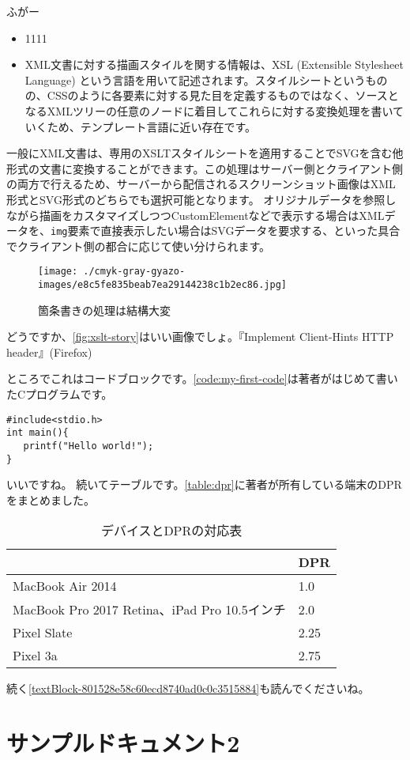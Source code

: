 ふがー
\begin{itemize}
  \item 1111
  \item XML文書に対する描画スタイルを関する情報は、XSL (Extensible Stylesheet Language) という言語を用いて記述されます。スタイルシートというものの、CSSのように各要素に対する見た目を定義するものではなく、ソースとなるXMLツリーの任意のノードに着目してこれらに対する変換処理を書いていくため、テンプレート言語に近い存在です。
\end{itemize}

一般にXML文書は、専用のXSLTスタイルシートを適用することでSVGを含む他形式の文書に変換することができます。この処理はサーバー側とクライアント側の両方で行えるため、サーバーから配信されるスクリーンショット画像はXML形式とSVG形式のどちらでも選択可能となります。
オリジナルデータを参照しながら描画をカスタマイズしつつCustomElementなどで表示する場合はXMLデータを、{\tt img}要素で直接表示したい場合はSVGデータを要求する、といった具合でクライアント側の都合に応じて使い分けられます。\\

\begin{figure}[h]
  \begin{center}
     \texttt{[image: ./cmyk-gray-gyazo-images/e8c5fe835beab7ea29144238c1b2ec86.jpg]}
     \caption{箇条書きの処理は結構大変}
     \label{fig:xslt-story}
  \end{center}
\end{figure}

どうですか、\autoref{fig:xslt-story}はいい画像でしょ。『Implement Client-Hints HTTP header』(Firefox)\par
ところでこれはコードブロックです。\autoref{code:my-first-code}は著者がはじめて書いたCプログラムです。
\begin{lstlisting}[frame=tb,label=code:my-first-code,caption=my\_first\_code.c]
#include<stdio.h>
int main(){
   printf("Hello world!");
}
\end{lstlisting}

いいですね。
続いてテーブルです。\autoref{table:dpr}に著者が所有している端末のDPRをまとめました。
\begin{table}[htb]
\begin{center}
  \caption{デバイスとDPRの対応表}
  \label{table:dpr}
  \begin{tabular}{|l|l|} \hline
     & DPR \\ \hline
    MacBook Air 2014 & 1.0 \\
    MacBook Pro 2017 Retina、iPad Pro 10.5インチ & 2.0 \\
    Pixel Slate & 2.25 \\
    Pixel 3a & 2.75 \\ \hline
  \end{tabular}
\end{center}
\end{table}

続く\autoref{textBlock-801528e58c60ecd8740ad0c0c3515884}も読んでくださいね。\\

\chapter{サンプルドキュメント2}
\label{textBlock-801528e58c60ecd8740ad0c0c3515884}


